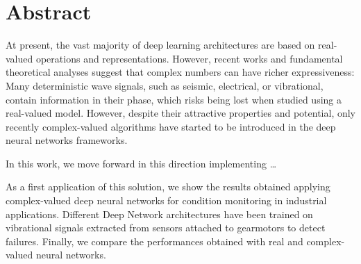 \documentclass[../main.tex]{subfiles}
\begin{document}
	
\chapter*{Abstract}

At present, the vast majority of deep learning architectures are based on real-valued operations and representations. However, recent works and fundamental theoretical analyses suggest that complex numbers can have richer expressiveness: Many deterministic wave signals, such as seismic, electrical, or vibrational, contain information in their phase, which risks being lost when studied using a real-valued model. However, despite their attractive properties and potential, only recently complex-valued algorithms have started to be introduced in the deep neural networks frameworks.

In this work, we move forward in this direction implementing …

As a first application of this solution, we show the results obtained applying complex-valued deep neural networks for condition monitoring in industrial applications. Different Deep Network architectures have been trained on vibrational signals extracted from sensors attached to gearmotors to detect failures. Finally, we compare the performances obtained with real and complex-valued neural networks.
\end{document}
